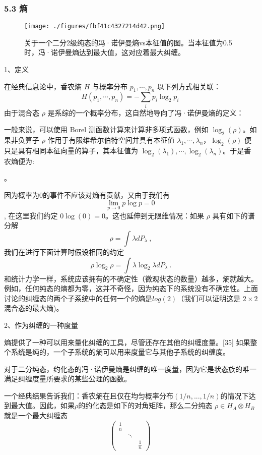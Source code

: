 \subsubsection{5.3 熵}
\begin{figure}[ht]
\centering
\texttt{[image: ./figures/fbf41c4327214d42.png]}
\caption{关于一个二分2级纯态的冯·诺伊曼熵vs本征值的图。当本征值为0.5时，冯·诺伊曼熵达到最大值，这对应着最大纠缠。} \label{fig_LZJC_4}
\end{figure}

1、定义

在经典信息论中，香农熵 $H$ 与概率分布 $p_1, \cdots, p_n$ 以下列方式相关联：
$$H(p_1, \cdots, p_n) = -\sum_i p_i \log_2 p_i~$$
由于混合态 $\rho$ 是系综的一个概率分布，这自然地导向了冯·诺伊曼熵的定义：

一般来说，可以使用 Borel 测函数计算来计算非多项式函数，例如 $\log_2(\rho)$。如果非负算子 $\rho$ 作用于有限维希尔伯特空间并具有本征值 $\lambda_1, \cdots, \lambda_n$，$\log_2(\rho)$ 便只是具有相同本征向量的算子，其本征值为 $\log_2(\lambda_1), \cdots, \log_2(\lambda_n)$。于是香农熵便为:

。

因为概率为0的事件不应该对熵有贡献，又由于我们有
$$\lim_{p \to 0} p \log p = 0~$$,
在这里我们约定 $0 \log(0) = 0$。这也延伸到无限维情况：如果 $\rho$ 具有如下的谱分解
$$\rho = \int \lambda dP_{\lambda}~,$$
我们在进行下面计算时假设相同的约定
$$\rho \log_2 \rho = \int \lambda \log_2 \lambda dP_{\lambda}~.$$
和统计力学一样，系统应该拥有的不确定性（微观状态的数量）越多，熵就越大。例如，任何纯态的熵都为零，这并不奇怪，因为纯态下的系统没有不确定性。上面讨论的纠缠态的两个子系统中的任何一个的熵是$log(2)$（我们可以证明这是 $2\times2$ 混合态的最大熵)。

2、作为纠缠的一种度量

熵提供了一种可以用来量化纠缠的工具，尽管还存在其他的纠缠度量。[35] 如果整个系统是纯的，一个子系统的熵可以用来度量它与其他子系统的纠缠度。

对于二分纯态，约化态的冯·诺伊曼熵是纠缠的唯一度量，因为它是状态族的唯一满足纠缠度量所要求的某些公理的函数。

一个经典结果告诉我们：香农熵在且仅在均匀概率分布$(1/n, ..., 1/n)$的情况下达到最大值。因此，如果$\rho$的约化态是如下的对角矩阵，那么二分纯态 $\rho \in H_A \otimes H_B$ 就是一个最大纠缠态
$$\begin{pmatrix}\frac{1}{n} & & \\& \ddots & \\& & \frac{1}{n}\end{pmatrix}~$$

